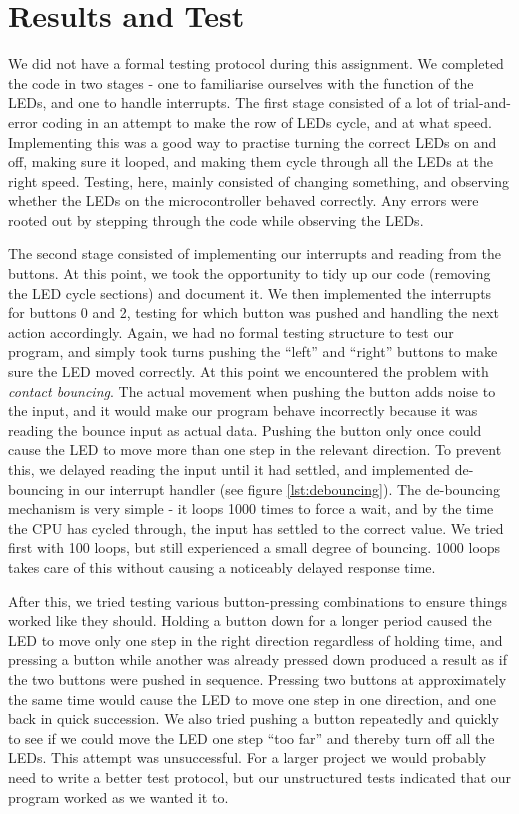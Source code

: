 \section{Results and Test}
We did not have a formal testing protocol during this assignment. We completed the code in two stages - one to familiarise ourselves with the function of the LEDs, and one to handle interrupts. The first stage consisted of a lot of trial-and-error coding in an attempt to make the row of LEDs cycle, and at what speed. Implementing this was a good way to practise turning the correct LEDs on and off, making sure it looped, and making them cycle through all the LEDs at the right speed. Testing, here, mainly consisted of changing something, and observing whether the LEDs on the microcontroller behaved correctly. Any errors were rooted out by stepping through the code while observing the LEDs.

The second stage consisted of implementing our interrupts and reading from the buttons. At this point, we took the opportunity to tidy up our code (removing the LED cycle sections) and document it. We then implemented the interrupts for buttons 0 and 2, testing for which button was pushed and handling the next action accordingly. Again, we had no formal testing structure to test our program, and simply took turns pushing the ``left'' and ``right'' buttons to make sure the LED moved correctly. At this point we encountered the problem with {\em contact bouncing}. The actual movement when pushing the button adds noise to the input, and it would make our program behave incorrectly because it was reading the bounce input as actual data. Pushing the button only once could cause the LED to move more than one step in the relevant direction. To prevent this, we delayed reading the input until it had settled, and implemented de-bouncing in our interrupt handler (see figure \ref{lst:debouncing}). The de-bouncing mechanism is very simple - it loops 1000 times to force a wait, and by the time the CPU has cycled through, the input has settled to the correct value. We tried first with 100 loops, but still experienced a small degree of bouncing. 1000 loops takes care of this without causing a noticeably delayed response time.

After this, we tried testing various button-pressing combinations to ensure things worked like they should. Holding a button down for a longer period caused the LED to move only one step in the right direction regardless of holding time, and pressing a button while another was already pressed down produced a result as if the two buttons were pushed in sequence. Pressing two buttons at approximately the same time would cause the LED to move one step in one direction, and one back in quick succession. We also tried pushing a button repeatedly and quickly to see if we could move the LED one step ``too far'' and thereby turn off all the LEDs. This attempt was unsuccessful. For a larger project we would probably need to write a better test protocol, but our unstructured tests indicated that our program worked as we wanted it to.


